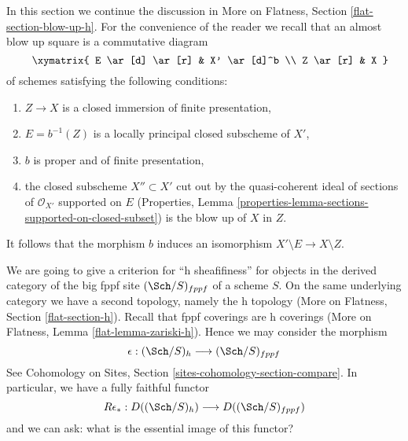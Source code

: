 \noindent
In this section we continue the discussion in
More on Flatness, Section \ref{flat-section-blow-up-h}.
For the convenience of the reader we recall that an
almost blow up square is a commutative diagram
\begin{equation}
\label{equation-almost-blow-up-square}
\vcenter{
\xymatrix{
E \ar[d] \ar[r] & X' \ar[d]^b \\
Z \ar[r] & X
}
}
\end{equation}
of schemes satisfying the following conditions:
\begin{enumerate}
\item $Z \to X$ is a closed immersion of finite presentation,
\item $E = b^{-1}(Z)$ is a locally principal closed subscheme of $X'$,
\item $b$ is proper and of finite presentation,
\item the closed subscheme $X'' \subset X'$ cut out by the quasi-coherent
ideal of sections of $\mathcal{O}_{X'}$ supported on $E$
(Properties, Lemma \ref{properties-lemma-sections-supported-on-closed-subset})
is the blow up of $X$ in $Z$.
\end{enumerate}
It follows that the morphism $b$ induces an isomorphism
$X' \setminus E \to X \setminus Z$.

\medskip\noindent
We are going to give a criterion for ``h sheafifiness'' for
objects in the derived category of the big fppf site
$(\Sch/S)_{fppf}$ of a scheme $S$. On the same underlying category
we have a second topology, namely the h topology
(More on Flatness, Section \ref{flat-section-h}).
Recall that fppf coverings are h coverings
(More on Flatness, Lemma \ref{flat-lemma-zariski-h}). Hence we may
consider the morphism
$$
\epsilon : (\Sch/S)_h \longrightarrow (\Sch/S)_{fppf}
$$
See Cohomology on Sites, Section \ref{sites-cohomology-section-compare}.
In particular, we have a fully faithful functor
$$
R\epsilon_* : D((\Sch/S)_h) \longrightarrow D((\Sch/S)_{fppf})
$$
and we can ask: what is the essential image of this functor?

